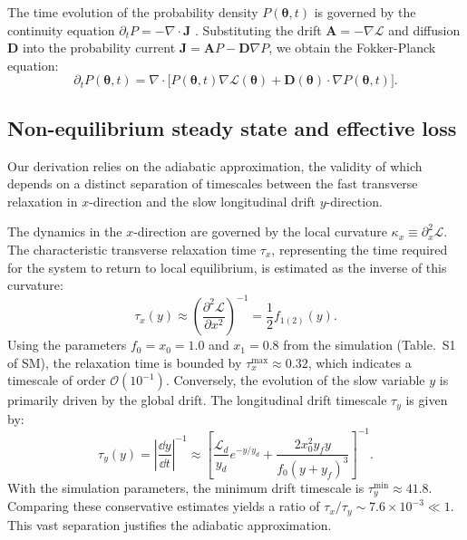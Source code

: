 \documentclass[aps,prx,reprint,superscriptaddress,longbibliography,nofootinbib,floatfix]{revtex4-2}
\begin{document}
The time evolution of the probability density $P(\bm{\theta}, t)$ is governed by the continuity equation $\partial_t P = -\nabla \cdot \mathbf{J}$ \cite{gardiner2009stochastic}. Substituting the drift $\mathbf{A} = -\nabla \mathcal{L}$ and diffusion $\mathbf{D}$ into the probability current $\mathbf{J} = \mathbf{A}P - \mathbf{D}\nabla P$, we obtain the Fokker-Planck equation:
\begin{equation}
    \partial_t P(\bm{\theta}, t) = \nabla \cdot \Big[ P(\bm{\theta}, t) \nabla \mathcal{L}(\bm{\theta}) 
    + \mathbf{D}(\bm{\theta}) \cdot \nabla P(\bm{\theta}, t) \Big].
    \label{eq:si_fp_final} 
\end{equation}

\subsection{Non-equilibrium steady state and effective loss} \label{sec:appendix2}

Our derivation relies on the adiabatic approximation, the validity of which depends on a distinct separation of timescales between the fast transverse relaxation in $x$-direction and the slow longitudinal drift $y$-direction.

The dynamics in the $x$-direction are governed by the local curvature $\kappa_x \equiv \partial_x^2 \mathcal{L}$. The characteristic transverse relaxation time $\tau_x$, representing the time required for the system to return to local equilibrium, is estimated as the inverse of this curvature:
\begin{equation}
    \tau_x(y) \approx \left( \frac{\partial^2 \mathcal{L}}{\partial x^2} \right)^{-1} = \frac{1}{2} f_{1(2)}(y).
\end{equation}
Using the parameters $f_0=x_0=1.0$ and $x_1=0.8$ from the simulation (Table.~S1 of SM), the relaxation time is bounded by $\tau_x^{\mathrm{max}} \approx 0.32$, which indicates a timescale of order $\mathcal{O}(10^{-1})$. Conversely, the evolution of the slow variable $y$ is primarily driven by the global drift. The longitudinal drift timescale $\tau_y$ is given by:
\begin{equation}
    \tau_y(y) = \left| \frac{\dd y}{\dd t} \right|^{-1}\approx \left[ \frac{\mathcal{L}_d}{y_d} e^{-y/y_d} +\frac{2x_0^2 y_f y}{f_0(y+y_f)^3} \right]^{-1}.
\end{equation}
With the simulation parameters, the minimum drift timescale is $\tau_y^{\mathrm{min}} \approx 41.8$. Comparing these conservative estimates yields a ratio of $\tau_x / \tau_y \sim 7.6 \times 10^{-3} \ll 1$. This vast separation justifies the adiabatic approximation.
\end{document}
